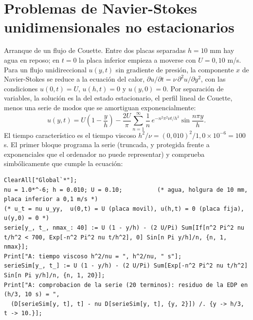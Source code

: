 \documentclass[10pt,openany]{book}
\begin{document}
\section{Problemas de Navier-Stokes unidimensionales no estacionarios}

Arranque de un flujo de Couette. Entre dos placas separadas \(h = 10\) mm hay agua en reposo; en \(t = 0\) la placa inferior empieza a moverse con \(U = 0{,}10\) m/s. Para un flujo unidireccional \(u(y, t)\) sin gradiente de presión, la componente \(x\) de Navier-Stokes se reduce a la ecuación del calor, \(\partial u/\partial t = \nu\,\partial^{2}u/\partial y^{2}\), con las condiciones \(u(0, t) = U\), \(u(h, t) = 0\) y \(u(y, 0) = 0\). Por separación de variables, la solución es la del estado estacionario, el perfil lineal de Couette, menos una serie de modos que se amortiguan exponencialmente:
\begin{equation}
u(y,t) = U\left(1 - \frac{y}{h}\right) - \frac{2U}{\pi}\sum_{n=1}^{\infty}\frac{1}{n}\,e^{-n^{2}\pi^{2}\nu t/h^{2}}\sin\frac{n\pi y}{h}. \label{eq:m07-serie}
\end{equation}
El tiempo característico es el tiempo viscoso \(h^{2}/\nu = (0{,}010)^2/1{,}0\times 10^{-6} = 100\) s. El primer bloque programa la serie (truncada, y protegida frente a exponenciales que el ordenador no puede representar) y comprueba simbólicamente que cumple la ecuación:
\begin{lstlisting}[style=studium]
ClearAll["Global`*"];
nu = 1.0*^-6; h = 0.010; U = 0.10;          (* agua, holgura de 10 mm, placa inferior a 0,1 m/s *)
(* u_t = nu u_yy,  u(0,t) = U (placa movil), u(h,t) = 0 (placa fija), u(y,0) = 0 *)
serie[y_, t_, nmax_: 40] := U (1 - y/h) - (2 U/Pi) Sum[If[n^2 Pi^2 nu t/h^2 < 700, Exp[-n^2 Pi^2 nu t/h^2], 0] Sin[n Pi y/h]/n, {n, 1, nmax}];
Print["A: tiempo viscoso h^2/nu = ", h^2/nu, " s"];
serieSim[y_, t_] := U (1 - y/h) - (2 U/Pi) Sum[Exp[-n^2 Pi^2 nu t/h^2] Sin[n Pi y/h]/n, {n, 1, 20}];
Print["A: comprobacion de la serie (20 terminos): residuo de la EDP en (h/3, 10 s) = ",
  (D[serieSim[y, t], t] - nu D[serieSim[y, t], {y, 2}]) /. {y -> h/3, t -> 10.}];
\end{lstlisting}
\end{document}
